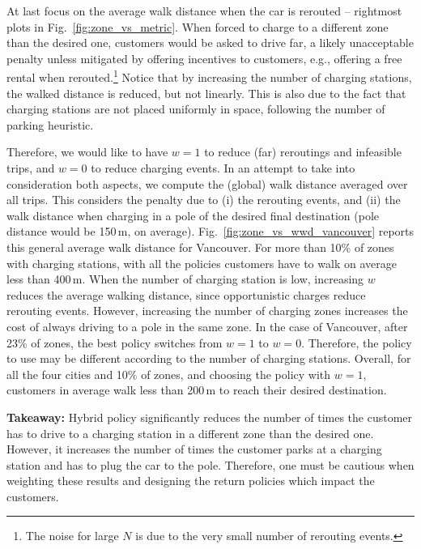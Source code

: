 At last focus on the average walk distance when the car is rerouted -- rightmost plots in Fig.~\ref{fig:zone_vs_metric}. When forced to charge to a different zone than the desired one, customers would be asked to drive far, a likely unacceptable penalty unless mitigated by offering incentives to customers, e.g., offering a free rental when rerouted.\footnote{The noise for large $N$ is due to the very small number of rerouting events.} Notice that by increasing the number of charging stations, the walked distance is reduced, but not linearly. This is also due to the fact that charging stations are not placed uniformly in space, following the number of parking heuristic. 



Therefore, we would like to have $w=1$ to reduce (far) reroutings and infeasible trips, and $w=0$ to reduce charging events. In an attempt to take into consideration both aspects, we compute the (global) walk distance averaged over all trips. This considers the penalty due to (i) the rerouting events, and (ii) the walk distance when charging in a pole of the desired final destination (pole distance would be 150\,m, on average).
Fig.~\ref{fig:zone_vs_wwd_vancouver} reports this general average walk distance for Vancouver. For more than 10\% of zones with charging stations, with all the policies customers have to walk on average less than 400\,m.
When the number of charging station is low, increasing $w$ reduces the average walking distance, since opportunistic charges reduce rerouting events. However, increasing the number of charging zones increases the cost of always driving to a pole in the same zone. In the case of Vancouver, after 23\% of zones, the best policy switches from $w=1$ to $w=0$. Therefore, the policy to use may be different according to the number of charging stations. Overall, for all the four cities and 10\% of zones, and choosing the policy with $w=1$, customers in average walk less than 200\,m to reach their desired destination.

\textbf{Takeaway:} Hybrid policy significantly reduces the number of times the customer has to drive to a charging station in a different zone than the desired one. However, it increases the number of times the customer parks at a charging station and has to plug the car to the pole. Therefore, one must  be cautious when weighting these results and designing the return policies which impact the customers. 


